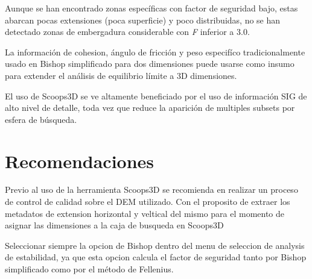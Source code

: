 Aunque se han encontrado zonas espec\'ificas con factor de seguridad bajo, estas abarcan pocas extensiones (poca superficie) y poco distribuidas, no se han detectado zonas de embergadura considerable con \textit{F} inferior a 3.0.

La informaci\'on de cohesion, \'angulo de fricci\'on y peso especif\'ico tradicionalmente usado en Bishop simplificado para dos dimensiones puede usarse como insumo para extender el an\'alisis  de equilibrio l\'imite a 3D dimensiones.

El uso de Scoops3D se ve altamente beneficiado por el uso de informaci\'on SIG de alto nivel de detalle, toda vez que reduce la aparición de multiples subsets por esfera de búsqueda.



\section{Recomendaciones}

Previo al uso de la herramienta Scoops3D se recomienda en realizar un proceso de control de calidad sobre el DEM utilizado. Con el proposito de extraer los metadatos de extension horizontal y veltical del mismo para el momento de asignar las dimensiones a la caja de busqueda en Scoops3D

Seleccionar siempre la opcion de Bishop dentro del menu de seleccion de analysis de estabilidad, ya que esta opcion calcula el factor de seguridad tanto por Bishop simplificado como por el método de Fellenius.
